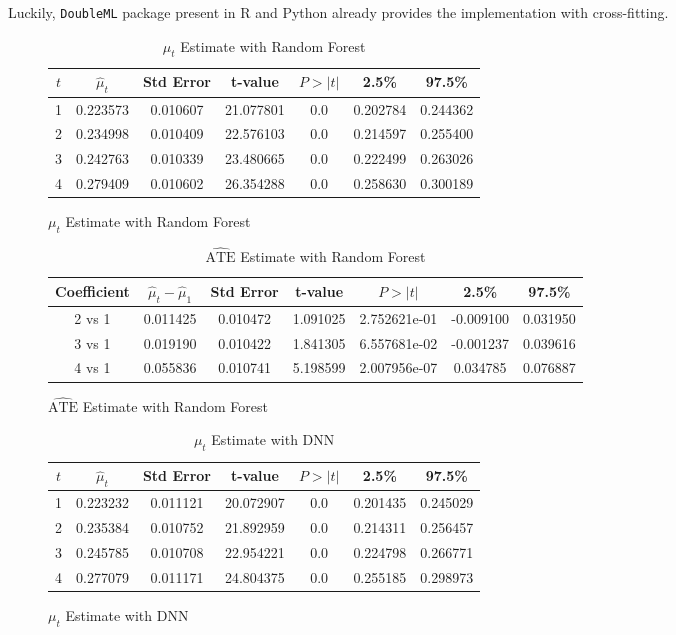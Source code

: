 \documentclass{article}
\begin{document}
Luckily, \texttt{DoubleML} package present in R and Python already provides the implementation with cross-fitting.

\begin{figure}[H]
  \begin{table}[H]
  \centering
  \begin{tabular}{|ccccccc|}
    \hline
    $t$ & $\hat{\mu}_t$	& Std Error &	t-value	& $P>|t|$	& 2.5\%	& 97.5\% \\
    \hline
    1	& 0.223573 & 0.010607	& 21.077801	& 0.0 &	0.202784 & 0.244362 \\
    2	& 0.234998 & 0.010409	& 22.576103	& 0.0 &	0.214597 & 0.255400 \\
    3	& 0.242763 & 0.010339	& 23.480665	& 0.0 &	0.222499 & 0.263026 \\
    4	& 0.279409 & 0.010602	& 26.354288	& 0.0 &	0.258630 & 0.300189 \\
    \hline
  \end{tabular}
  \caption{$\mu_t$ Estimate with Random Forest}
\end{table}
\end{figure}

\begin{figure}[H]
  \begin{table}[H]
  \centering
  \begin{tabular}{|ccccccc|}
    \hline
    Coefficient & $\hat{\mu}_t - \hat{\mu}_1$	& Std Error &	t-value	& $P>|t|$	& 2.5\%	& 97.5\% \\
    \hline
    2 vs 1	& 0.011425 & 0.010472	& 1.091025	& 2.752621e-01 &	-0.009100 & 0.031950 \\
    3 vs 1	& 0.019190 & 0.010422	& 1.841305	& 6.557681e-02 &	-0.001237 & 0.039616 \\
    4 vs 1	& 0.055836 & 0.010741	& 5.198599	& 2.007956e-07 &	 0.034785 & 0.076887 \\
    \hline
  \end{tabular}
  \caption{$\hat{\text{ATE}}$ Estimate with Random Forest}
\end{table}
\end{figure}

\begin{figure}[H]
  \begin{table}[H]
  \centering
  \begin{tabular}{|ccccccc|}
    \hline
    $t$ & $\hat{\mu}_t$	& Std Error &	t-value	& $P>|t|$	& 2.5\%	& 97.5\% \\
    \hline
    1	& 0.223232 & 0.011121	& 20.072907	& 0.0 &	0.201435 & 0.245029 \\
    2	& 0.235384 & 0.010752	& 21.892959	& 0.0 &	0.214311 & 0.256457 \\
    3	& 0.245785 & 0.010708	& 22.954221	& 0.0 &	0.224798 & 0.266771 \\
    4	& 0.277079 & 0.011171	& 24.804375	& 0.0 &	0.255185 & 0.298973 \\
    \hline
  \end{tabular}
  \caption{$\mu_t$ Estimate with DNN}
\end{table}
\end{figure}
\end{document}
